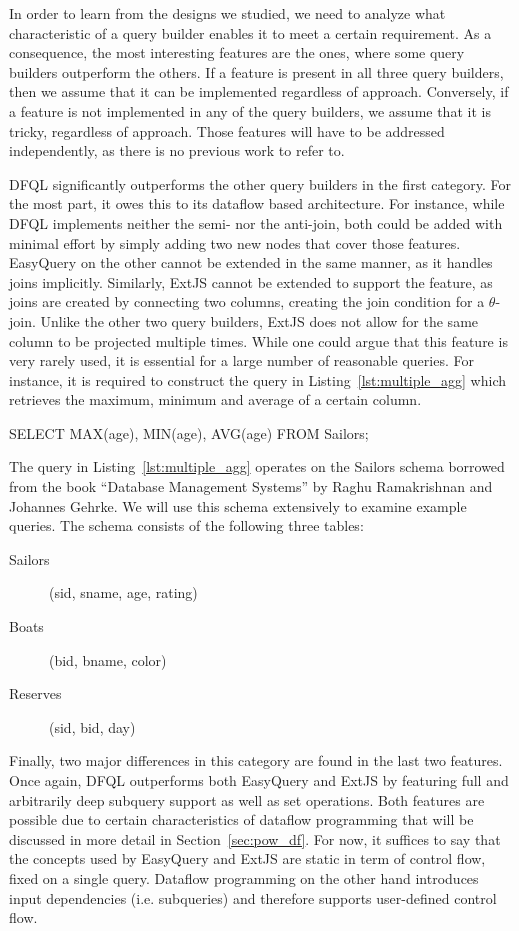 \documentclass[11pt,a4paper]{globis-book}
\begin{document}
In order to learn from the designs we studied, we need to analyze what characteristic of a query builder enables it to meet a certain requirement. 
As a consequence, the most interesting features are the ones, where some query builders outperform the others. If a feature is present in all three query builders, then we assume that it can be implemented regardless of approach. Conversely, if a feature is not implemented in any of the query builders, we assume that it is tricky, regardless of approach. Those features will have to be addressed independently, as there is no previous work to refer to.

DFQL significantly outperforms the other query builders in the first category. For the most part, it owes this to its dataflow based architecture. For instance, while DFQL implements neither the semi- nor the anti-join, both could be added with minimal effort by simply adding two new nodes that cover those features. EasyQuery on the other cannot be extended in the same manner, as it handles joins implicitly. Similarly, ExtJS cannot be extended to support the feature, as joins are created by connecting two columns, creating the join condition for a $\theta$-join. Unlike the other two query builders, ExtJS does not allow for the same column to be projected multiple times. While one could argue that this feature is very rarely used, it is essential for a large number of reasonable queries. For instance, it is required to construct the query in Listing~\ref{lst:multiple_agg} which retrieves the maximum, minimum and average of a certain column.
\begin{codeex}[caption=A query that uses the same column multiple times, label=lst:multiple_agg]
SELECT MAX(age), MIN(age), AVG(age)
FROM Sailors;
\end{codeex}

The query in Listing~\ref{lst:multiple_agg} operates on the Sailors schema borrowed from the book ``Database Management Systems'' by Raghu Ramakrishnan and Johannes Gehrke\cite{ramakrishnan2000dms}. We will use this schema extensively to examine example queries. The schema consists of the following three tables:
\begin{description}
\item[Sailors](sid, sname, age, rating)
\item[Boats](bid, bname, color)
\item[Reserves](sid, bid, day)
\end{description}

Finally, two major differences in this category are found in the last two features. Once again, DFQL outperforms both EasyQuery and ExtJS by featuring full and arbitrarily deep subquery support as well as set operations. Both features are possible due to certain characteristics of dataflow programming that will be discussed in more detail in Section~\ref{sec:pow_df}. For now, it suffices to say that the concepts used by EasyQuery and ExtJS are static in term of control flow, fixed on a single query. Dataflow programming on the other hand introduces input dependencies (i.e. subqueries) and therefore supports user-defined control flow.
\end{document}
